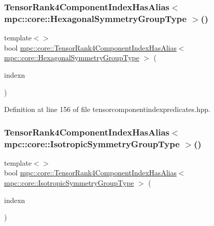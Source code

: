 \subsubsection{\texorpdfstring{Tensor\+Rank4\+Component\+Index\+Has\+Alias$<$ mpc\+::core\+::\+Hexagonal\+Symmetry\+Group\+Type $>$()}{TensorRank4ComponentIndexHasAlias< mpc::core::HexagonalSymmetryGroupType >()}}
{\footnotesize\ttfamily template$<$$>$ \\
bool \mbox{\hyperlink{namespacempc_1_1core_a7242817d0014fa66d25e5cf10a2c4ddf}{mpc\+::core\+::\+Tensor\+Rank4\+Component\+Index\+Has\+Alias}}$<$ \mbox{\hyperlink{structmpc_1_1core_1_1_hexagonal_symmetry_group_type}{mpc\+::core\+::\+Hexagonal\+Symmetry\+Group\+Type}} $>$ (\begin{DoxyParamCaption}\item[{const \mbox{\hyperlink{namespacempc_1_1core_a54c081f41b2475abd10182bf023805d2}{mpc\+::core\+::\+Tensor\+Rank4\+Component\+Index}} \&}]{indexn }\end{DoxyParamCaption})\hspace{0.3cm}{\ttfamily [inline]}}



Definition at line 156 of file tensorcomponentindexpredicates.\+hpp.

\mbox{\label{namespacempc_1_1core_a43b1363c53c73157fd5344004173d0be}} 
\subsubsection{\texorpdfstring{Tensor\+Rank4\+Component\+Index\+Has\+Alias$<$ mpc\+::core\+::\+Isotropic\+Symmetry\+Group\+Type $>$()}{TensorRank4ComponentIndexHasAlias< mpc::core::IsotropicSymmetryGroupType >()}}
{\footnotesize\ttfamily template$<$$>$ \\
bool \mbox{\hyperlink{namespacempc_1_1core_a7242817d0014fa66d25e5cf10a2c4ddf}{mpc\+::core\+::\+Tensor\+Rank4\+Component\+Index\+Has\+Alias}}$<$ \mbox{\hyperlink{structmpc_1_1core_1_1_isotropic_symmetry_group_type}{mpc\+::core\+::\+Isotropic\+Symmetry\+Group\+Type}} $>$ (\begin{DoxyParamCaption}\item[{const \mbox{\hyperlink{namespacempc_1_1core_a54c081f41b2475abd10182bf023805d2}{mpc\+::core\+::\+Tensor\+Rank4\+Component\+Index}} \&}]{indexn }\end{DoxyParamCaption})\hspace{0.3cm}{\ttfamily [inline]}}



